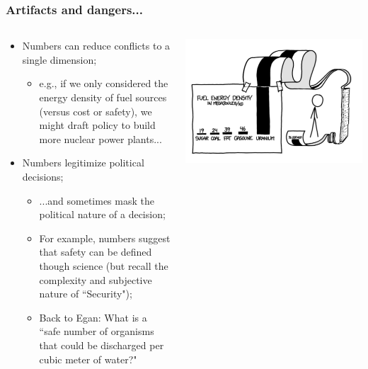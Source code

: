 \documentclass[aspectratio=169]{beamer}
\theoremstyle{principle}
\begin{document}
\begin{frame}
\frametitle{Artifacts and dangers...}
\begin{columns}
\begin{column}{0.5\textwidth}

\begin{itemize}
\item Numbers can reduce conflicts to a single dimension;
\begin{itemize}
\item e.g., if we only considered the energy density of fuel sources (versus cost or safety), we might draft policy to build more nuclear power plants...
\end{itemize} 
\item Numbers legitimize political decisions;
\begin{itemize}
\item ...and sometimes mask the political nature of a decision;
\item For example, numbers suggest that safety can be defined though science (but recall the complexity and subjective nature of ``Security");
\item Back to Egan: What is a ``safe number of organisms that could be discharged per cubic meter of water?"
\end{itemize}
\end{itemize}

\end{column}
\begin{column}{0.5\textwidth}
\includegraphics[scale=0.4]{energy.png}
\end{column}
\end{columns}

\end{frame}
\end{document}
